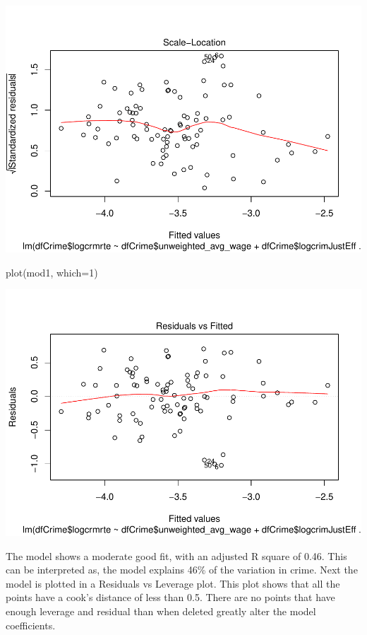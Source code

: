 \documentclass[]{article}
\newenvironment{Shaded}{}{}
\newcommand{\DataTypeTok}[1]{#1}
\newcommand{\DecValTok}[1]{#1}
\newcommand{\KeywordTok}[1]{\textcolor[rgb]{0.00,0.00,1.00}{#1}}
\newcommand{\NormalTok}[1]{#1}
\begin{document}
\includegraphics{Bagnard_Gaustad_Hartman_Leung_Lab_3_files/figure-latex/unnamed-chunk-78-1.pdf}

\begin{Shaded}
\begin{Highlighting}[]
\KeywordTok{plot}\NormalTok{(mod1, }\DataTypeTok{which=}\DecValTok{1}\NormalTok{)}
\end{Highlighting}
\end{Shaded}

\includegraphics{Bagnard_Gaustad_Hartman_Leung_Lab_3_files/figure-latex/unnamed-chunk-79-1.pdf}

The model shows a moderate good fit, with an adjusted R square of 0.46.
This can be interpreted as, the model explains 46\% of the variation in
crime. Next the model is plotted in a Residuals vs Leverage plot. This
plot shows that all the points have a cook's distance of less than 0.5.
There are no points that have enough leverage and residual than when
deleted greatly alter the model coefficients.
\end{document}
